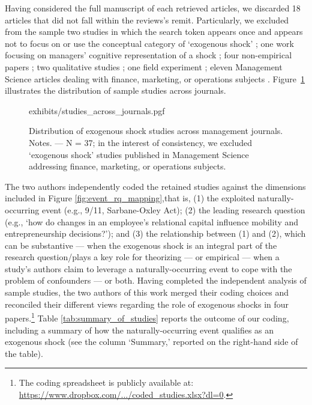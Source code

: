 \documentclass[11pt]{article}
\begin{document}
\begin{refsection}
Having considered the full manuscript of each retrieved articles, we discarded
18 articles that did not fall within the reviews's remit. Particularly, 
we excluded from the sample two studies in which the search token appears once
and 
appears not to focus on or use the conceptual category of `exogenous shock'
\autocite{uzzi199735,kriauciunas2006659}; one work focusing on managers'
cognitive representation of a shock \autocite{barreto2013687}; four
non-empirical papers
\autocite[e.g.,][]{mcsweeney2009933}; two qualitative studies
\autocite{glynn20051031, jenkins2010884}; one field experiment 
\autocite{cui20191216}; eleven Management Science articles dealing with 
finance, marketing, or operations subjects \autocite[e.g.,][]{tham20182901}.
Figure~\ref{fig:studies_across_journals} illustrates the distribution of sample
studies across journals.

\vspace{2em}

\begin{figure}[!htbp]
    \centering
    {exhibits/studies_across_journals.pgf}
    \caption{Distribution of exogenous shock studies across
    management journals.  Notes. --- N = 37; in the interest of consistency, we
    excluded `exogenous shock' studies published in Management Science
    addressing finance, marketing, or operations subjects.}
    \label{fig:studies_across_journals}
\end{figure}         

\vspace{2em}

The two authors independently coded the retained studies against the dimensions 
included in Figure \ref{fig:event_rq_mapping},that is, (1) the exploited 
naturally-occurring event (e.g., 9/11, Sarbane-Oxley Act); (2) the leading
research question (e.g., `how do changes in an employee's relational capital
influence mobility and entrepreneurship decisions?'); and (3) the relationship
between (1) and (2), which can be substantive --- when the exogenous shock is an
integral part of the research question/plays a key role for theorizing 
--- or empirical --- when a study's authors claim to leverage a
naturally-occurring event to cope with the problem of confounders --- or both.
Having completed the independent analysis of sample studies, the two authors of
this work merged their coding choices and reconciled their different views
regarding the role of exogenous shocks in four papers.\footnote{The coding
spreadsheet is publicly available at: \href{
https://www.dropbox.com/s/yl0sf9p9tq253fy/coded_studies.csv?dl=0}
{https://www.dropbox.com/.../coded\_studies.xlsx?dl=0}.} Table
\ref{tab:summary_of_studies} reports the outcome of our coding, including a
summary of how the naturally-occurring event qualifies as an exogenous shock
(see the column `Summary,' reported on the right-hand side of the table).


\end{refsection}
\end{document}
